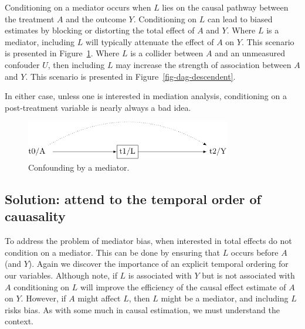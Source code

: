 \documentclass[
  singlecolumn]{report}
\begin{document}
Conditioning on a mediator occurs when \(L\) lies on the causal pathway
between the treatment \(A\) and the outcome \(Y\). Conditioning on \(L\)
can lead to biased estimates by blocking or distorting the total effect
of \(A\) and \(Y\). Where \(L\) is a mediator, including \(L\) will
typically attenuate the effect of \(A\) on \(Y\). This scenario is
presented in Figure~\ref{fig-dag-mediator}. Where \(L\) is a collider
between \(A\) and an unmeasured confouder \(U\), then including \(L\)
may increase the strength of association between \(A\) and \(Y\). This
scenario is presented in Figure~\ref{fig-dag-descendent}.

In either case, unless one is interested in mediation analysis,
conditioning on a post-treatment variable is nearly always a bad idea.

\begin{figure}

{\centering \includegraphics[width=0.8\textwidth,height=\textheight]{causal-dags_files/figure-pdf/fig-dag-mediator-1.pdf}

}

\caption{\label{fig-dag-mediator}Confounding by a mediator.}

\end{figure}

\hypertarget{solution-attend-to-the-temporal-order-of-cauasality-2}{%
\subsection{Solution: attend to the temporal order of
cauasality}\label{solution-attend-to-the-temporal-order-of-cauasality-2}}

To address the problem of mediator bias, when interested in total
effects do not condition on a mediator. This can be done by ensuring
that \(L\) occurs before \(A\) (and \(Y\)). Again we discover the
importance of an explicit temporal ordering for our variables. Although
note, if \(L\) is associated with \(Y\) but is not associated with \(A\)
conditioning on \(L\) will improve the efficiency of the causal effect
estimate of \(A\) on \(Y\). However, if \(A\) might affect \(L\), then
\(L\) might be a mediator, and including \(L\) risks bias. As with some
much in causal estimation, we must understand the context.
\end{document}
